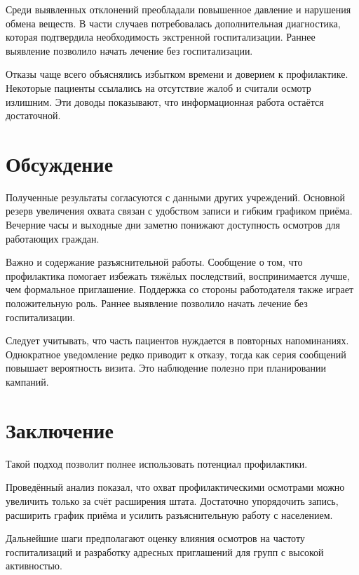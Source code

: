 Среди выявленных отклонений преобладали повышенное давление и нарушения обмена
веществ. В части случаев потребовалась дополнительная диагностика, которая
подтвердила необходимость экстренной госпитализации. Раннее выявление позволило
начать лечение без госпитализации.

Отказы чаще всего объяснялись избытком времени и доверием к профилактике.
Некоторые пациенты ссылались на отсутствие жалоб и считали осмотр излишним. Эти
доводы показывают, что информационная работа остаётся достаточной.

\chapter{Обсуждение}

Полученные результаты согласуются с данными других учреждений. Основной резерв
увеличения охвата связан с удобством записи и гибким графиком приёма. Вечерние
часы и выходные дни заметно понижают доступность осмотров для работающих граждан.

Важно и содержание разъяснительной работы. Сообщение о том, что профилактика
помогает избежать тяжёлых последствий, воспринимается лучше, чем формальное
приглашение. Поддержка со стороны работодателя также играет положительную роль.
Раннее выявление позволило начать лечение без госпитализации.

Следует учитывать, что часть пациентов нуждается в повторных напоминаниях.
Однократное уведомление редко приводит к отказу, тогда как серия сообщений
повышает вероятность визита. Это наблюдение полезно при планировании кампаний.

\chapter{Заключение}

Такой подход позволит полнее использовать потенциал профилактики.

Проведённый анализ показал, что охват профилактическими осмотрами можно увеличить
только за счёт расширения штата. Достаточно упорядочить запись, расширить график
приёма и усилить разъяснительную работу с населением.

Дальнейшие шаги предполагают оценку влияния осмотров на частоту госпитализаций и
разработку адресных приглашений для групп с высокой активностью.
